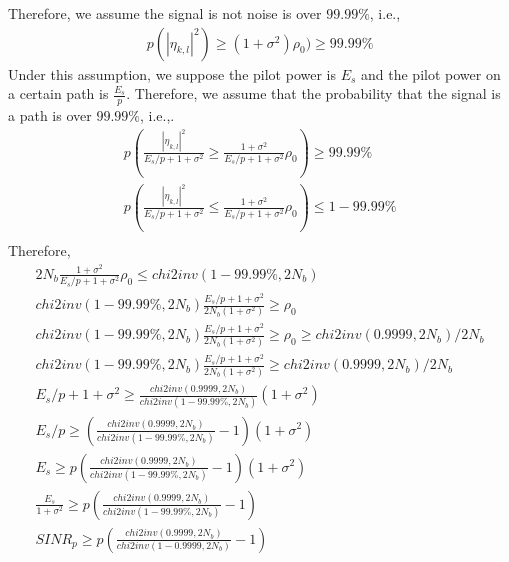 \documentclass{article}
\begin{document}
Therefore, we assume the signal is not noise is over $99.99\%$, i.e.,
\begin{equation}
\begin{split}
p(|\eta_{k,l}|^2) \geq (1+\sigma^2)\rho_0) \geq 99.99\%
\end{split}
\end{equation}
Under this assumption, we suppose the pilot power is ${E_s}$ and the pilot power on a certain path is $\frac{E_s}{p}$. Therefore, we assume that the probability that the signal is a path is over $99.99\%$, i.e.,.
\begin{equation}
\begin{split}
p(\frac{|\eta_{k,l}|^2}{E_s/p + 1+\sigma^2}  \geq \frac{1+\sigma^2}{E_s/p + 1+\sigma^2} \rho_0) \geq 99.99\% \\
p(\frac{|\eta_{k,l}|^2}{E_s/p + 1+\sigma^2}  \leq \frac{1+\sigma^2}{E_s/p + 1+\sigma^2} \rho_0) \leq 1-99.99\% \\
\end{split}
\end{equation}
Therefore,
\begin{equation}
\begin{split}
2N_b\frac{1+\sigma^2}{E_s/p + 1+\sigma^2}\rho_0 \leq chi2inv(1-99.99\%, 2N_b) \\
chi2inv(1-99.99\%, 2N_b)\frac{E_s/p + 1+\sigma^2}{2N_b(1+\sigma^2)} \geq \rho_0\\
chi2inv(1-99.99\%, 2N_b)\frac{E_s/p + 1+\sigma^2}{2N_b(1+\sigma^2)} \geq \rho_0 \geq chi2inv(0.9999, 2N_b)/2N_b \\
chi2inv(1-99.99\%, 2N_b)\frac{E_s/p + 1+\sigma^2}{2N_b(1+\sigma^2)} \geq chi2inv(0.9999, 2N_b)/2N_b \\
E_s/p + 1+\sigma^2 \geq \frac{chi2inv(0.9999, 2N_b)}{chi2inv(1-99.99\%, 2N_b)}(1+\sigma^2 ) \\
E_s/p \geq (\frac{chi2inv(0.9999, 2N_b)}{chi2inv(1-99.99\%, 2N_b)} - 1)(1+\sigma^2 ) \\
E_s \geq p(\frac{chi2inv(0.9999, 2N_b)}{chi2inv(1-99.99\%, 2N_b)} - 1)(1+\sigma^2 ) \\
\frac{E_s}{1+\sigma^2} \geq p(\frac{chi2inv(0.9999, 2N_b)}{chi2inv(1-99.99\%, 2N_b)} - 1) \\
SINR_p \geq p(\frac{chi2inv(0.9999, 2N_b)}{chi2inv(1-0.9999, 2N_b)} - 1)
\end{split}
\end{equation}
\end{document}
